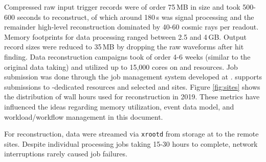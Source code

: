 \documentclass[../main-v1.tex]{subfiles}
\begin{document}

Compressed raw input trigger records were of order 75\,MB in size and took 500-600 seconds to reconstruct, of which around 180\,s was signal processing and the remainder high-level reconstruction dominated by 40-60 cosmic rays per readout.  Memory footprints for data processing ranged between 2.5 and 4\,GB.  Output   record sizes were reduced to 35\,MB by dropping the raw waveforms after hit finding.   Data reconstruction campaigns took of order 4-6 weeks (similar to the original data taking) and utilized up to 15,000 cores on  and  resources.  Job submission was done through the \cite{poms} job management system developed at .  supports submissions to -dedicated resources and selected  and  sites.  Figure \ref{fig:sites} shows the distribution of wall hours used for reconstruction in 2019.
These metrics have influenced the ideas regarding memory utilization, event data model, and workload/workflow management in this document.

For reconstruction, data were streamed via {\tt xrootd}\cite{Behrmann:2011zz} from  storage at  to the remote sites. Despite individual processing jobs taking 15-30 hours to complete, network interruptions rarely caused job failures. 
\end{document}
